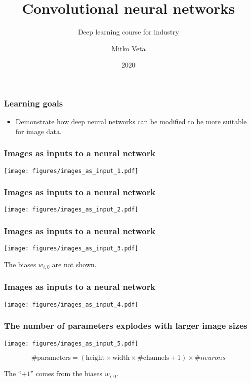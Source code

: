 \documentclass[notes]{beamer}          %
\title{Convolutional neural networks}
\subtitle{Deep learning course for industry }
\author{Mitko Veta}
\institute{Eindhoven University of Technology

Department of Biomedical Engineering}
\date{2020}
\begin{document}
 
\frame{\titlepage}


\begin{frame}
\frametitle{Learning goals}
\begin{itemize}
    \item Demonstrate how deep neural networks can be modified to be more suitable for image data.
\end{itemize}
\end{frame}

\begin{frame}
\frametitle{Images as inputs to a neural network}
\begin{center}
\texttt{[image: figures/images\_as\_input\_1.pdf]} \\
\end{center}
\end{frame}

\begin{frame}
\frametitle{Images as inputs to a neural network}
\begin{center}
\texttt{[image: figures/images\_as\_input\_2.pdf]} \\
\end{center}
\end{frame}

\begin{frame}
\frametitle{Images as inputs to a neural network}
\begin{center}
\texttt{[image: figures/images\_as\_input\_3.pdf]} \\
\end{center}
\tiny{The biases $w_{i,0}$ are not shown.}
\end{frame}

\begin{frame}
\frametitle{Images as inputs to a neural network}
\begin{center}
\texttt{[image: figures/images\_as\_input\_4.pdf]} \\
\end{center}
\end{frame}

\begin{frame}
\frametitle{The number of parameters explodes with larger image sizes}
\begin{center}
\texttt{[image: figures/images\_as\_input\_5.pdf]} \\
\end{center}
\pause
$$\text{\# parameters} = (\text{height} \times \text{width} \times \text{\# channels} + 1) \times{\# neurons}$$

\tiny{The ``$ + 1$'' comes from the biases $w_{i,0}$.}
\end{frame}
\end{document}
